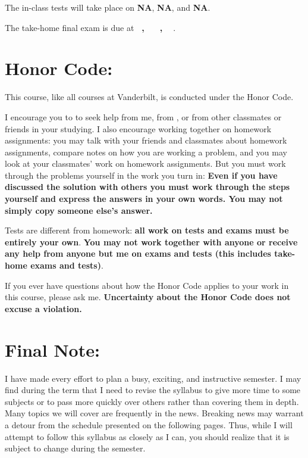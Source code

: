 \documentclass[11pt]{jgsyllabus}\usepackage[]{graphicx}\usepackage[]{xcolor}
\begin{document}
The in-class tests will take place on
\textbf{NA},
\textbf{NA},
and
\textbf{NA}.

The take-home final exam is due at
\ifAltFinal
\textbf{\AltFinalExamEndTime~\AltFinalExamDay, \AltFinalExamMonth~\AltFinalExamDate}%
\else
\textbf{\FinalExamEndTime~\FinalExamDay, \FinalExamMonth~\FinalExamDate}%
\fi
.

\section{Honor Code:}
This course, like all courses at Vanderbilt, is conducted under the Honor Code.

I encourage you to to seek help from me, from \TaTitle,
or from other classmates or friends in your studying. I also encourage working together
on homework assignments: you may talk with your friends and classmates about
homework assignments, compare notes on how you are working a problem, and you
may look at your classmates' work on homework assignments. %
But you must work through the problems yourself
in the work you turn in: \textbf{Even if you have discussed the solution with others you must
work through the steps yourself and express the answers in your own words. You may not
simply copy someone else's answer.} %

Tests are different from homework: \textbf{%
all work on tests and exams must be entirely your own}.
\textbf{You may not work together with anyone or receive any help from anyone but me
on exams and tests (this includes take-home exams and tests)}.

If you ever
have questions about how the Honor Code applies to your work
in this course, please ask me.
\textbf{Uncertainty about the Honor Code does not excuse a violation.}

\section{Final Note:}

I have made every effort to plan a busy, exciting, and instructive semester.
I may find during the term that I need to revise the syllabus to give more time
to some subjects or to pass more quickly over others rather than covering them
in depth. Many topics we will cover are frequently in the news. Breaking news
may warrant a detour from the schedule presented on the following pages.
Thus, while I will attempt to follow this syllabus as closely as I can,
you should realize that it is subject to change during the semester.
%
%
\iftrue
\end{document}
